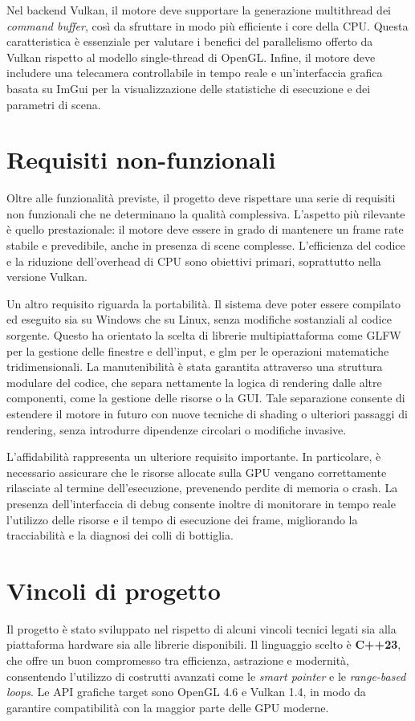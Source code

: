 \documentclass[12pt,a4paper,openright,twoside]{book}
\begin{document}
Nel backend Vulkan, il motore deve supportare la generazione multithread dei \emph{command buffer}, così da sfruttare
in modo più efficiente i core della CPU. Questa caratteristica è essenziale per valutare i benefici del parallelismo
offerto da Vulkan rispetto al modello single-thread di OpenGL. Infine, il motore deve includere una telecamera
controllabile in tempo reale e un'interfaccia grafica basata su ImGui per la visualizzazione delle statistiche di
esecuzione e dei parametri di scena.

\section{Requisiti non-funzionali}
Oltre alle funzionalità previste, il progetto deve rispettare una serie di requisiti non funzionali che ne
determinano la qualità complessiva. L'aspetto più rilevante è quello prestazionale: il motore deve essere in grado
di mantenere un frame rate stabile e prevedibile, anche in presenza di scene complesse. L'efficienza del codice e
la riduzione dell'overhead di CPU sono obiettivi primari, soprattutto nella versione Vulkan.

Un altro requisito riguarda la portabilità. Il sistema deve poter essere compilato ed eseguito sia su Windows che su
Linux, senza modifiche sostanziali al codice sorgente. Questo ha orientato la scelta di librerie multipiattaforma
come GLFW per la gestione delle finestre e dell'input, e glm per le operazioni matematiche tridimensionali.
La manutenibilità è stata garantita attraverso una struttura modulare del codice, che separa nettamente la logica di
rendering dalle altre componenti, come la gestione delle risorse o la GUI. Tale separazione consente di estendere il
motore in futuro con nuove tecniche di shading o ulteriori passaggi di rendering, senza introdurre dipendenze
circolari o modifiche invasive.

L'affidabilità rappresenta un ulteriore requisito importante. In particolare, è necessario assicurare che le risorse
allocate sulla GPU vengano correttamente rilasciate al termine dell'esecuzione, prevenendo perdite di memoria o crash.
La presenza dell'interfaccia di debug consente inoltre di monitorare in tempo reale l'utilizzo delle risorse e il
tempo di esecuzione dei frame, migliorando la tracciabilità e la diagnosi dei colli di bottiglia.

\section{Vincoli di progetto}
Il progetto è stato sviluppato nel rispetto di alcuni vincoli tecnici legati sia alla piattaforma hardware sia alle
librerie disponibili. Il linguaggio scelto è \textbf{C++23}, che offre un buon compromesso tra efficienza,
astrazione e modernità, consentendo l'utilizzo di costrutti avanzati come le \emph{smart pointer} e le
\emph{range-based loops}. Le API grafiche target sono OpenGL 4.6 e Vulkan 1.4, in modo da garantire compatibilità
con la maggior parte delle GPU moderne.
\end{document}
